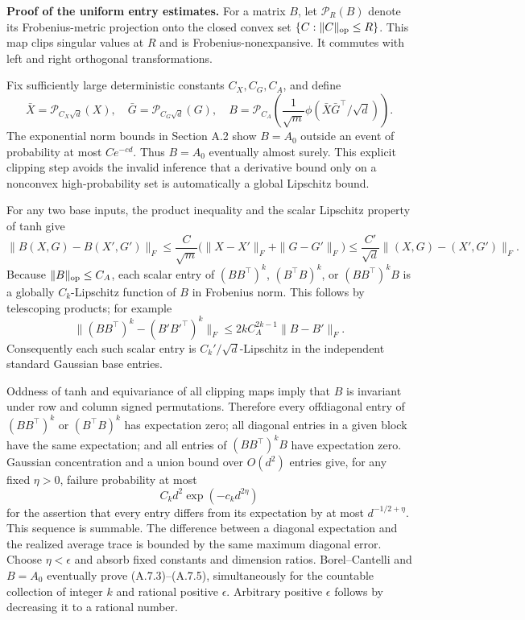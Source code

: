 \documentclass[
  11pt,
  a4paper,
]{article}
\begin{document}
\textbf{Proof of the uniform entry estimates.} For a matrix \(B\), let
\(\mathcal P_R(B)\) denote its Frobenius-metric projection onto the
closed convex set \(\{C:\|C\|_{\rm op}\le R\}\). This map clips singular
values at \(R\) and is Frobenius-nonexpansive. It commutes with left and
right orthogonal transformations.

Fix sufficiently large deterministic constants \(C_X,C_G,C_A\), and
define \[
\bar X=\mathcal P_{C_X\sqrt d}(X),\quad
\bar G=\mathcal P_{C_G\sqrt d}(G),\quad
B=\mathcal P_{C_A}\!\left(\frac1{\sqrt m}\phi(\bar X\bar G^\top/\sqrt d)\right).
\tag{A.7.6}
\] The exponential norm bounds in Section A.2 show \(B=A_0\) outside an
event of probability at most \(C e^{-cd}\). Thus \(B=A_0\) eventually
almost surely. This explicit clipping step avoids the invalid inference
that a derivative bound only on a nonconvex high-probability set is
automatically a global Lipschitz bound.

For any two base inputs, the product inequality and the scalar Lipschitz
property of tanh give \[
\|B(X,G)-B(X',G')\|_F
\le\frac C{\sqrt m}\big(\|X-X'\|_F+\|G-G'\|_F\big)
\le\frac {C'}{\sqrt d}\|(X,G)-(X',G')\|_F.
\tag{A.7.7}
\] Because \(\|B\|_{\rm op}\le C_A\), each scalar entry of
\((BB^\top)^k\), \((B^\top B)^k\), or \((BB^\top)^kB\) is a globally
\(C_k\)-Lipschitz function of \(B\) in Frobenius norm. This follows by
telescoping products; for example \[
\|(BB^\top)^k-(B'B'^\top)^k\|_F
\le 2k C_A^{2k-1}\|B-B'\|_F.
\] Consequently each such scalar entry is \(C_k'/\sqrt d\)-Lipschitz in
the independent standard Gaussian base entries.

Oddness of tanh and equivariance of all clipping maps imply that \(B\)
is invariant under row and column signed permutations. Therefore every
offdiagonal entry of \((BB^\top)^k\) or \((B^\top B)^k\) has expectation
zero; all diagonal entries in a given block have the same expectation;
and all entries of \((BB^\top)^kB\) have expectation zero. Gaussian
concentration and a union bound over \(O(d^2)\) entries give, for any
fixed \(\eta>0\), failure probability at most \[
C_kd^2\exp(-c_k d^{2\eta})
\] for the assertion that every entry differs from its expectation by at
most \(d^{-1/2+\eta}\). This sequence is summable. The difference
between a diagonal expectation and the realized average trace is bounded
by the same maximum diagonal error. Choose \(\eta<\epsilon\) and absorb
fixed constants and dimension ratios. Borel--Cantelli and \(B=A_0\)
eventually prove (A.7.3)--(A.7.5), simultaneously for the countable
collection of integer \(k\) and rational positive \(\epsilon\).
Arbitrary positive \(\epsilon\) follows by decreasing it to a rational
number.
\end{document}
